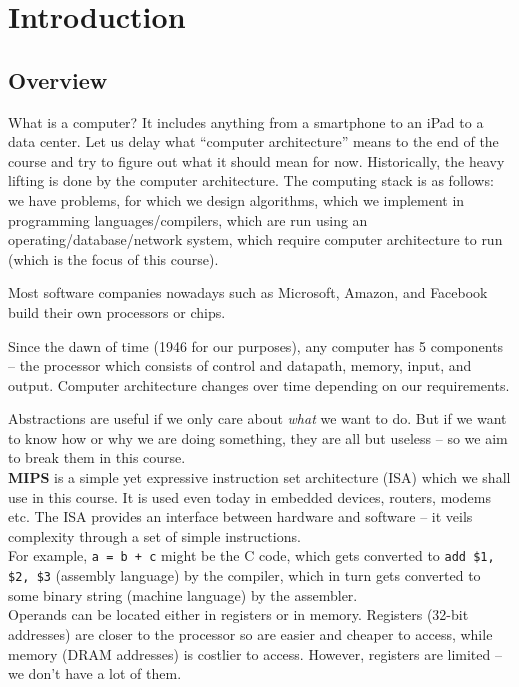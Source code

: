 \documentclass{article}
\begin{document}
\thispagestyle{empty}
\titleBC


\section{Introduction}

	\subsection{Overview}

		What is a computer? It includes anything from a smartphone to an iPad to a data center. Let us delay what ``computer architecture'' means to the end of the course and try to figure out what it should mean for now. Historically, the heavy lifting is done by the computer architecture. The computing stack is as follows: we have problems, for which we design algorithms, which we implement in programming languages/compilers, which are run using an operating/database/network system, which require computer architecture to run (which is the focus of this course).

		Most software companies nowadays such as Microsoft, Amazon, and Facebook build their own processors or chips.

		Since the dawn of time (1946 for our purposes), any computer has 5 components -- the processor which consists of control and datapath, memory, input, and output. Computer architecture changes over time depending on our requirements.

		Abstractions are useful if we only care about \emph{what} we want to do. But if we want to know how or why we are doing something, they are all but useless -- so we aim to break them in this course.\\

		\textbf{MIPS} is a simple yet expressive instruction set architecture (ISA) which we shall use in this course. It is used even today in embedded devices, routers, modems etc. The ISA provides an interface between hardware and software -- it veils complexity through a set of simple instructions.\\
		For example, \texttt{a = b + c} might be the C code, which gets converted to \texttt{add \$1, \$2, \$3} (assembly language) by the compiler, which in turn gets converted to some binary string (machine language) by the assembler.\\
		Operands can be located either in registers or in memory. Registers (32-bit addresses) are closer to the processor so are easier and cheaper to access, while memory (DRAM addresses) is costlier to access. However, registers are limited -- we don't have a lot of them.
\end{document}
